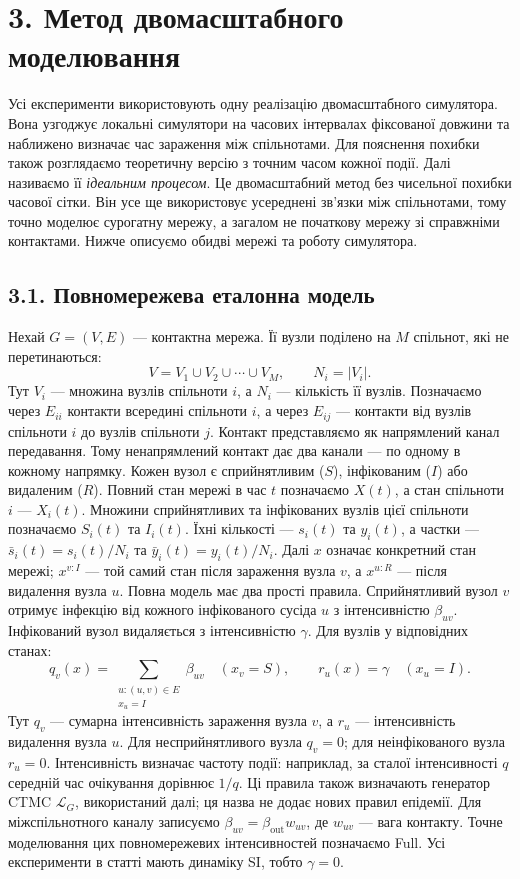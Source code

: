 \documentclass[11pt,a4paper]{article}
\newcommand{\ibar}{\bar{y}}
\newcommand{\sbar}{\bar{s}}
\newcommand{\Full}{\textnormal{Full}}
\begin{document}
\section*{3. Метод двомасштабного моделювання}

Усі експерименти використовують одну реалізацію двомасштабного симулятора. Вона узгоджує локальні симулятори на часових інтервалах фіксованої довжини та наближено визначає час зараження між спільнотами. Для пояснення похибки також розглядаємо теоретичну версію з точним часом кожної події. Далі називаємо її \emph{ідеальним процесом}. Це двомасштабний метод без чисельної похибки часової сітки. Він усе ще використовує усереднені зв'язки між спільнотами, тому точно моделює сурогатну мережу, а загалом не початкову мережу зі справжніми контактами. Нижче описуємо обидві мережі та роботу симулятора.
\subsection*{3.1. Повномережева еталонна модель}

Нехай $G=(V,E)$ --- контактна мережа. Її вузли поділено на $M$ спільнот, які не перетинаються:
\begin{equation*}V=V_1\cup V_2\cup\cdots\cup V_M,
\qquad N_i=|V_i|.\tag{1}
\end{equation*}
Тут $V_i$ --- множина вузлів спільноти $i$, а $N_i$ --- кількість її вузлів. Позначаємо через $E_{ii}$ контакти всередині спільноти $i$, а через $E_{ij}$ --- контакти від вузлів спільноти $i$ до вузлів спільноти $j$. Контакт представляємо як напрямлений канал передавання. Тому ненапрямлений контакт дає два канали --- по одному в кожному напрямку.
Кожен вузол є сприйнятливим ($S$), інфікованим ($I$) або видаленим ($R$). Повний стан мережі в час $t$ позначаємо $X(t)$, а стан спільноти $i$ --- $X_i(t)$. Множини сприйнятливих та інфікованих вузлів цієї спільноти позначаємо $S_i(t)$ та $I_i(t)$. Їхні кількості --- $s_i(t)$ та $y_i(t)$, а частки --- $\sbar_i(t)=s_i(t)/N_i$ та $\ibar_i(t)=y_i(t)/N_i$. Далі $x$ означає конкретний стан мережі; $x^{v:I}$ --- той самий стан після зараження вузла $v$, а $x^{u:R}$ --- після видалення вузла $u$.
Повна модель має два прості правила. Сприйнятливий вузол $v$ отримує інфекцію від кожного інфікованого сусіда $u$ з інтенсивністю $\beta_{uv}$. Інфікований вузол видаляється з інтенсивністю $\gamma$. Для вузлів у відповідних станах:
\begin{equation*}q_v(x)=\sum_{\substack{u:(u,v)\in E\\x_u=I}}\beta_{uv}
\quad (x_v=S),
\qquad r_u(x)=\gamma\quad (x_u=I).\tag{2}
\end{equation*}
Тут $q_v$ --- сумарна інтенсивність зараження вузла $v$, а $r_u$ --- інтенсивність видалення вузла $u$. Для несприйнятливого вузла $q_v=0$; для неінфікованого вузла $r_u=0$. Інтенсивність визначає частоту події: наприклад, за сталої інтенсивності $q$ середній час очікування дорівнює $1/q$. Ці правила також визначають генератор CTMC $\mathcal{L}_G$, використаний далі; ця назва не додає нових правил епідемії. Для міжспільнотного каналу записуємо $\beta_{uv}=\beta_{\mathrm{out}}w_{uv}$, де $w_{uv}$ --- вага контакту. Точне моделювання цих повномережевих інтенсивностей позначаємо \Full{}. Усі експерименти в статті мають динаміку SI, тобто $\gamma=0$.
\end{document}
